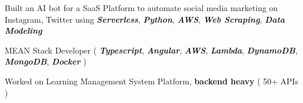 \documentclass[]{deedy-resume-reversed}
\begin{document}
\begin{tightemize}
\item Built an AI bot for a SaaS Platform to automate social media marketing on Instagram, Twitter using \textbf{\textit{Serverless}}, \textbf{\textit{Python}}, \textbf{\textit{AWS}}, \textbf{\textit{Web Scraping}}, \textbf{\textit{Data Modeling}}
\item MEAN Stack Developer ( \textbf{\textit{Typescript}}, \textbf{\textit{Angular}}, \textbf{\textit{AWS}}, \textbf{\textit{Lambda}}, \textbf{\textit{DynamoDB}}, \textbf{\textit{MongoDB}}, \textbf{\textit{Docker}} )
\item Worked on Learning Management System Platform, \textbf{backend heavy} ( 50+ APIs )
\end{tightemize}
\sectionsep

%
%
\end{document}
